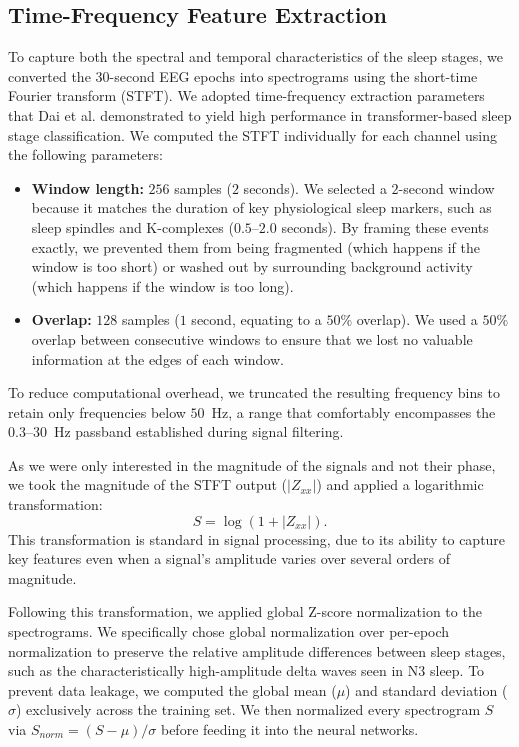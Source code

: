 \subsection{Time-Frequency Feature Extraction}
To capture both the spectral and temporal characteristics of the sleep stages, we converted the $30$-second EEG epochs into spectrograms using the short-time Fourier transform (STFT). We adopted time-frequency extraction parameters that Dai et al. \cite{transformersleep2023} demonstrated to yield high performance in transformer-based sleep stage classification. We computed the STFT individually for each channel using the following parameters:

\begin{itemize}
    \item \textbf{Window length:} $256$ samples ($2$ seconds). We selected a $2$-second window because it matches the duration of key physiological sleep markers, such as sleep spindles and K-complexes ($0.5$--$2.0$ seconds). By framing these events exactly, we prevented them from being fragmented (which happens if the window is too short) or washed out by surrounding background activity (which happens if the window is too long).
    \item \textbf{Overlap:} $128$ samples ($1$ second, equating to a $50\%$ overlap). We used a $50\%$ overlap between consecutive windows to ensure that we lost no valuable information at the edges of each window.
\end{itemize}

To reduce computational overhead, we truncated the resulting frequency bins to retain only frequencies below $50$~Hz, a range that comfortably encompasses the $0.3$--$30$~Hz passband established during signal filtering. 

As we were only interested in the magnitude of the signals and not their phase, we took the magnitude of the STFT output ($|Z_{xx}|$) and applied a logarithmic transformation:
\begin{equation}
    S = \log(1 + |Z_{xx}|).
\end{equation}
This transformation is standard in signal processing, due to its ability to capture key features even when a signal's amplitude varies over several orders of magnitude.

Following this transformation, we applied global Z-score normalization to the spectrograms. We specifically chose global normalization over per-epoch normalization to preserve the relative amplitude differences between sleep stages, such as the characteristically high-amplitude delta waves seen in N3 sleep. To prevent data leakage, we computed the global mean ($\mu$) and standard deviation ($\sigma$) exclusively across the training set. We then normalized every spectrogram $S$ via $S_{norm} = (S - \mu) / \sigma$ before feeding it into the neural networks.

